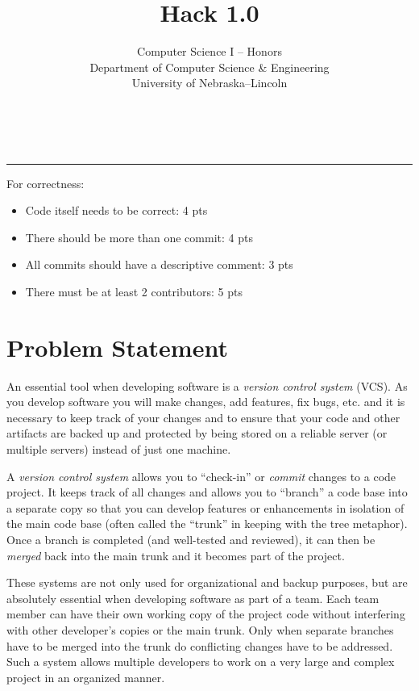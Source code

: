 \documentclass[12pt]{scrartcl}
\title{Hack 1.0}\let\Title\@title
\subtitle{Computer Science I -- Honors\\
{\small
\vskip1cm
Department of Computer Science \& Engineering \\
University of Nebraska--Lincoln}
\vskip-1cm}
\date{~}
\begin{document}
\maketitle

\hrule



For correctness:
\begin{itemize}
  \item Code itself needs to be correct: 4 pts
  \item There should be more than one commit: 4 pts
  \item All commits should have a descriptive comment: 3 pts
  \item There must be at least 2 contributors: 5 pts
\end{itemize}

\section*{Problem Statement}

An essential tool when developing software is a \emph{version control system}
(VCS).  As you develop software you will make changes, add features, fix bugs, etc.
and it is necessary to keep track of your changes and to ensure that your 
code and other artifacts are backed up and protected by being stored on a 
reliable server (or multiple servers) instead of just one machine.  

A \emph{version control system} allows you to ``check-in'' or 
\emph{commit} changes to a code project.  It keeps track of all changes 
and allows you to ``branch'' a code base into a separate copy so that 
you can develop features or enhancements in isolation of the
main code base (often called the ``trunk'' in keeping with the tree 
metaphor).  Once a branch is completed (and well-tested and 
reviewed), it can then be \emph{merged} back into the main trunk 
and it becomes part of the project.

These systems are not only used for organizational and backup 
purposes, but are absolutely essential when developing software 
as part of a team.  Each team member can have their own working 
copy of the project code without interfering with other developer's 
copies or the main trunk.  Only when separate branches have to 
be merged into the trunk do conflicting changes have to be addressed.  
Such a system allows multiple developers to work on a 
very large and complex project in an organized manner.
\end{document}
